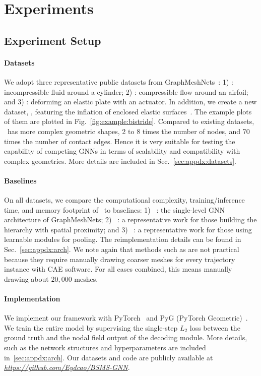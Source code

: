\section{Experiments}
\label{sec:experiments}


\subsection{Experiment Setup}
\label{sec:experiments:setup}
\paragraph*{Datasets} We adopt three representative public datasets from GraphMeshNets~\cite{pfaff2020learning}: 1) \cylinder: incompressible fluid around a cylinder; 2) \airfoil: compressible flow around an airfoil; and 3) \plate: deforming an elastic plate with an actuator. In addition, we create a new dataset, \fonts, featuring the inflation of enclosed elastic surfaces~\cite{fang2021guaranteed}. The example plots of them are plotted in Fig.~\ref{fig:example:bistride}.
Compared to existing datasets, \fonts~has more complex geometric shapes, 2 to 8 times the number of nodes, and 70 times the number of contact edges. Hence it is very suitable for testing the capability of competing GNNs in terms of scalability and compatibility with complex geometries. More details are included in Sec.~\ref{sec:appdx:datasets}.
\paragraph*{Baselines} On all datasets, we compare the computational complexity, training/inference time, and memory footprint of \ours~to baselines: 1) \flatGNN~\cite{pfaff2020learning}: the single-level GNN architecture of GraphMeshNets; 2) \linoGNN~\cite{lino2021simulating,lino2022towards,lino2022multi}: a representative work for those building the hierarchy with spatial proximity; and 3) \GUN~\cite{gao2019graph}: a representative work for those using learnable modules for pooling. The reimplementation details can be found in Sec.~\ref{sec:appdx:arch}. We note again that methods such as \cite{liu2021multi,fortunato2022multiscale} are not practical because they require manually drawing coarser meshes for every trajectory instance with CAE software. For all cases combined, this means manually drawing about $20,000$ meshes.
\paragraph*{Implementation} We implement our framework with PyTorch~\cite{pytorch19lib} and PyG (PyTorch Geometric)~\cite{pygeo19lib}. We train the entire model by supervising the single-step $L_2$ loss between the ground truth and the nodal field output of the decoding module. More details, such as the network structures and hyperparameters are included in~\ref{sec:appdx:arch}.
Our datasets and code are publicly available at \textit{\url{https://github.com/Eydcao/BSMS-GNN}}.

